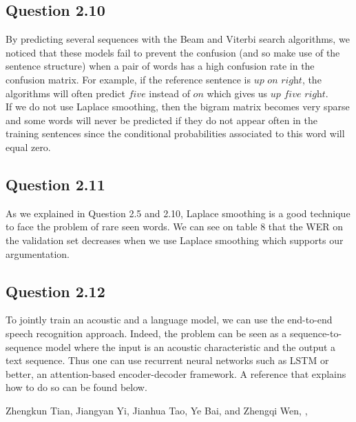 \documentclass[9pt,twocolumn,letterpaper]{article}
\begin{document}
\begin{table}
\begin{center}
\end{center}
\caption{{\bf Word Error Rate.} We compare the Viterbi and Beam search on the test set and a subset of the train set containing 300 elements with and without smoothing.}
\end{table}


\subsection{Question 2.10}
By predicting several sequences with the Beam and Viterbi search algorithms, we noticed that these models fail to prevent the confusion (and so make use of the sentence structure) when a pair of words has a high confusion rate in the confusion matrix. For example, if the reference sentence is $\textit{up on right}$, the algorithms will often predict $\textit{five}$ instead of $\textit{on}$ which gives us $\textit{up five right}$.\\
If we do not use Laplace smoothing, then the bigram matrix becomes very sparse and some words will never be predicted if they do not appear often in the training sentences since the conditional probabilities associated to this word will equal zero.

\subsection{Question 2.11}
As we explained in Question 2.5 and 2.10, Laplace smoothing is a good technique to face the problem of rare seen words. We can see on table 8 that the WER on the validation set decreases when we use Laplace smoothing which supports our argumentation.

\subsection{Question 2.12}
To jointly train an acoustic and a language model, we can use the end-to-end speech recognition approach. Indeed, the problem can be seen as a sequence-to-sequence model where the input is an acoustic characteristic and the output a text sequence. Thus one can use recurrent neural networks such as LSTM or better, an attention-based encoder-decoder framework. A reference that explains how to do so can be found below.



\begin{thebibliography}{4}

Zhengkun Tian, Jiangyan Yi, Jianhua Tao, Ye Bai, and Zhengqi Wen,
,



\end{thebibliography}
\end{document}
